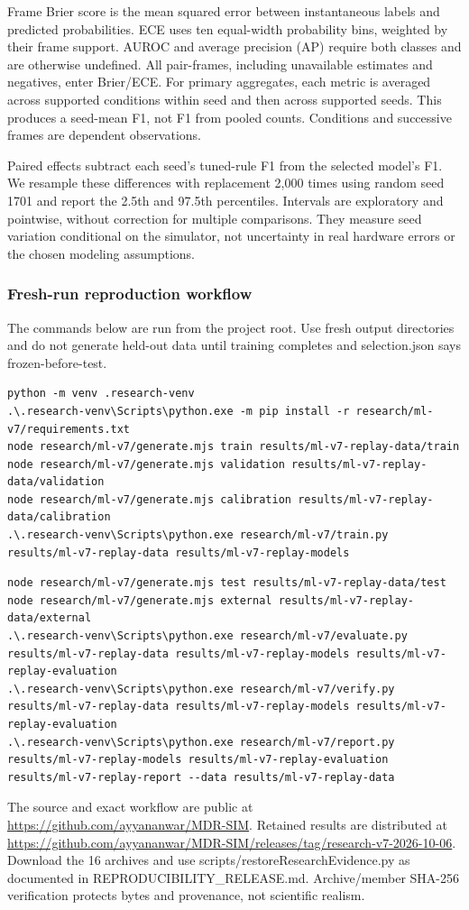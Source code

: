 \documentclass[12pt,a4paper]{report}
\begin{document}
Frame Brier score is the mean squared error between instantaneous labels and predicted probabilities. ECE uses ten equal-width probability bins, weighted by their frame support. AUROC and average precision (AP) require both classes and are otherwise undefined. All pair-frames, including unavailable estimates and negatives, enter Brier/ECE. For primary aggregates, each metric is averaged across supported conditions within seed and then across supported seeds. This produces a seed-mean F1, not F1 from pooled counts. Conditions and successive frames are dependent observations.

Paired effects subtract each seed's tuned-rule F1 from the selected model's F1. We resample these differences with replacement 2,000 times using random seed 1701 and report the 2.5th and 97.5th percentiles. Intervals are exploratory and pointwise, without correction for multiple comparisons. They measure seed variation conditional on the simulator, not uncertainty in real hardware errors or the chosen modeling assumptions.

\subsubsection*{Fresh-run reproduction workflow}
The commands below are run from the project root. Use fresh output directories and do not generate held-out data until training completes and selection.json says frozen-before-test.
\begin{lstlisting}[language={},caption={Development generation and frozen training}]
python -m venv .research-venv
.\.research-venv\Scripts\python.exe -m pip install -r research/ml-v7/requirements.txt
node research/ml-v7/generate.mjs train results/ml-v7-replay-data/train
node research/ml-v7/generate.mjs validation results/ml-v7-replay-data/validation
node research/ml-v7/generate.mjs calibration results/ml-v7-replay-data/calibration
.\.research-venv\Scripts\python.exe research/ml-v7/train.py results/ml-v7-replay-data results/ml-v7-replay-models
\end{lstlisting}
\begin{lstlisting}[language={},caption={Held-out evaluation and verification}]
node research/ml-v7/generate.mjs test results/ml-v7-replay-data/test
node research/ml-v7/generate.mjs external results/ml-v7-replay-data/external
.\.research-venv\Scripts\python.exe research/ml-v7/evaluate.py results/ml-v7-replay-data results/ml-v7-replay-models results/ml-v7-replay-evaluation
.\.research-venv\Scripts\python.exe research/ml-v7/verify.py results/ml-v7-replay-data results/ml-v7-replay-models results/ml-v7-replay-evaluation
.\.research-venv\Scripts\python.exe research/ml-v7/report.py results/ml-v7-replay-models results/ml-v7-replay-evaluation results/ml-v7-replay-report --data results/ml-v7-replay-data
\end{lstlisting}
The source and exact workflow are public at \url{https://github.com/ayyananwar/MDR-SIM}. Retained results are distributed at \url{https://github.com/ayyananwar/MDR-SIM/releases/tag/research-v7-2026-10-06}. Download the 16 archives and use scripts/restoreResearchEvidence.py as documented in REPRODUCIBILITY\_RELEASE.md. Archive/member SHA-256 verification protects bytes and provenance, not scientific realism.
\end{document}
